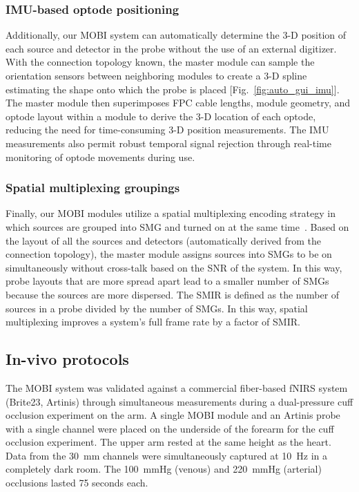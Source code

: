 \subsubsection{IMU-based optode positioning}
Additionally, our \ac{MOBI} system can automatically determine the 3-D position of each source and detector in the probe without the use of an external digitizer. With the connection topology known, the master module can sample the orientation sensors between neighboring modules to create a 3-D spline estimating the shape onto which the probe is placed [Fig.~\ref{fig:auto_gui_imu}]. The master module then superimposes \ac{FPC} cable lengths, module geometry, and optode layout within a module to derive the 3-D location of each optode, reducing the need for time-consuming 3-D position measurements. The \ac{IMU} measurements also permit robust temporal signal rejection through real-time monitoring of optode movements during use. 

\subsubsection{Spatial multiplexing groupings}
Finally, our \ac{MOBI} modules utilize a spatial multiplexing encoding strategy in which sources are grouped into \ac{SMG} and turned on at the same time~\cite{Vanegas2022}. Based on the layout of all the sources and detectors (automatically derived from the connection topology), the master module assigns sources into \ac{SMG}s to be on simultaneously without cross-talk based on the \ac{SNR} of the system. In this way, probe layouts that are more spread apart lead to a smaller number of \ac{SMG}s because the sources are more dispersed. The \ac{SMIR} is defined as the number of sources in a probe divided by the number of \ac{SMG}s. In this way, spatial multiplexing improves a system's full frame rate by a factor of \ac{SMIR}. 

\subsection{In-vivo protocols}
The \ac{MOBI} system was validated against a commercial fiber-based \ac{fNIRS} system (Brite23, Artinis) through simultaneous measurements during a dual-pressure cuff occlusion experiment on the arm. A single \ac{MOBI} module and an Artinis probe with a single channel were placed on the underside of the forearm for the cuff occlusion experiment. The upper arm rested at the same height as the heart. Data from the 30~mm channels were simultaneously captured at 10~Hz in a completely dark room. The 100~mmHg (venous) and 220~mmHg (arterial) occlusions lasted 75 seconds each. 

